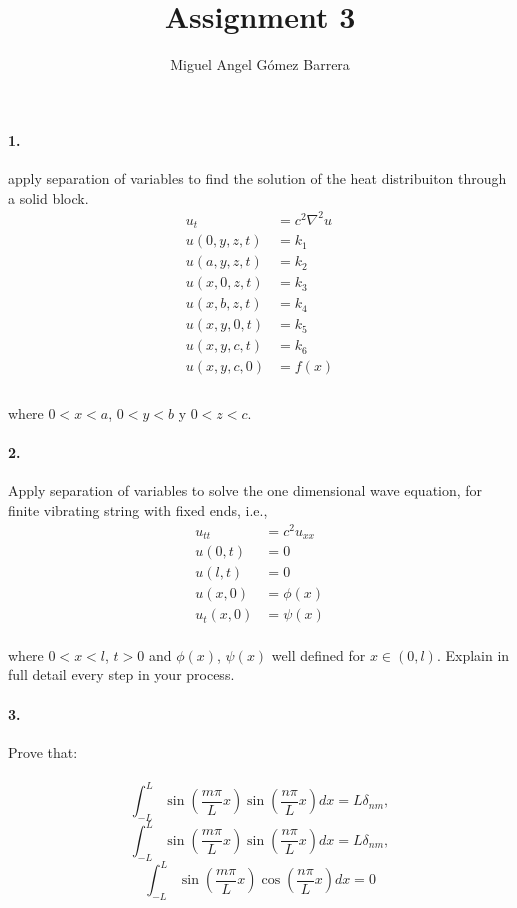 \documentclass{article}
\title{Assignment 3}
\author{Miguel Angel Gómez Barrera}
\begin{document}
	\maketitle
\paragraph{1.} apply separation of variables to find the solution of the heat distribuiton through a solid block.
\begin{align*}
	u_t &= c^2 \nabla^2 u\\
	u(0,y,z,t) &= k_1\\
	u(a,y,z,t) &= k_2\\
	u(x,0,z,t) &= k_3\\
	u(x,b,z,t) &= k_4\\
	u(x,y,0,t) &= k_5\\
	u(x,y,c,t) &= k_6\\
	u(x,y,c,0) &= f(x)\\
\end{align*}
\paragraph{} where $0 < x < a$, $0 < y < b$ y $0 < z < c$.
\paragraph{2.} Apply separation of variables to solve the one dimensional wave equation, for finite vibrating string with fixed ends, i.e.,
\begin{align*}
	u_{tt} &= c^2u_{xx}\\
	u(0,t) &= 0\\
	u(l, t) &= 0\\
	u(x, 0) &= \phi (x)\\
	u_t(x,0) &= \psi (x)
\end{align*}
\paragraph{} where $0 < x < l$, $t > 0$ and $\phi(x)$, $\psi(x)$ well defined for $x \in (0, l)$. Explain in full detail every step in your process.
\paragraph{3.} Prove that:
\paragraph{}$$\int_{-L}^{L} \sin \left(\frac{m\pi}{L} x\right) \sin \left(\frac{n\pi}{L} x\right) dx = L\delta_{nm},$$
$$\int_{-L}^{L} \sin \left(\frac{m\pi}{L} x\right) \sin \left(\frac{n\pi}{L} x\right) dx = L\delta_{nm},$$
$$\int_{-L}^{L} \sin \left(\frac{m\pi}{L} x\right) \cos \left(\frac{n\pi}{L} x\right) dx = 0$$
\end{document}
